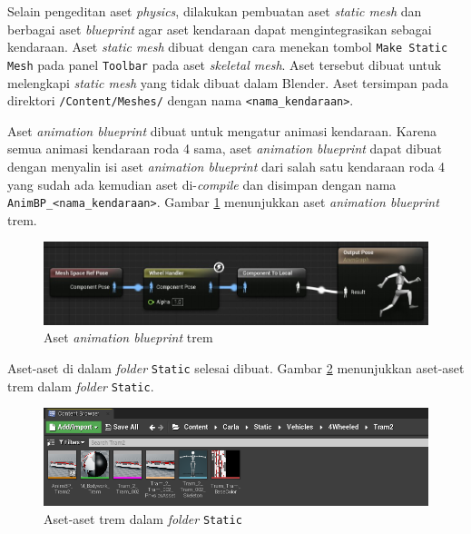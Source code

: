 Selain pengeditan aset \textit{physics}, dilakukan pembuatan aset \textit{static
mesh} dan berbagai aset \textit{blueprint} agar aset kendaraan dapat
mengintegrasikan sebagai kendaraan. Aset \textit{static mesh} dibuat dengan cara
menekan tombol \verb|Make Static Mesh| pada panel \verb|Toolbar| pada aset
\textit{skeletal mesh}. Aset tersebut dibuat untuk melengkapi \textit{static
mesh} yang tidak dibuat dalam Blender. Aset tersimpan pada direktori
\verb|/Content/Meshes/| dengan nama \verb|<nama_kendaraan>|.

Aset \textit{animation blueprint} dibuat untuk mengatur animasi kendaraan.
Karena semua animasi kendaraan roda 4 sama, aset \textit{animation blueprint}
dapat dibuat dengan menyalin isi aset \textit{animation blueprint} dari salah
satu kendaraan roda 4 yang sudah ada kemudian aset di-\textit{compile} dan
disimpan dengan nama \verb|AnimBP_<nama_kendaraan>|. Gambar
\ref{fig:blueprint-animation-4wheeled} menunjukkan aset \textit{animation
blueprint} trem.

\begin{figure}[!h]
    \centering
    \includegraphics[width=1\textwidth]{resources/chapter-4/tram-animation-blueprint.png}
    \caption{Aset \textit{animation blueprint} trem}
    \label{fig:blueprint-animation-4wheeled}
\end{figure}


Aset-aset di dalam \textit{folder} \verb|Static| selesai dibuat. Gambar
\ref{fig:tram-assets-in-static-folder} menunjukkan aset-aset trem dalam
\textit{folder} \verb|Static|.

\begin{figure}[!h]
    \centering
    \includegraphics[width=1\textwidth]{resources/chapter-4/tram-assets-in-static-folder.png}
    \caption{Aset-aset trem dalam \textit{folder} \texttt{Static}}
    \label{fig:tram-assets-in-static-folder}
\end{figure}

